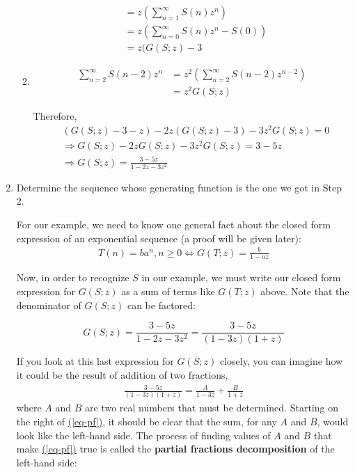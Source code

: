 \documentclass[10pt,]{book}
\newcommand{\terminology}[1]{\textbf{#1}}
\theoremstyle{plain}
\theoremstyle{definition}
\theoremstyle{definition}
\theoremstyle{definition}
\theoremstyle{definition}
\numberwithin{equation}{section}
\begin{document}
\begin{enumerate}[label=\arabic*]
\begin{enumerate}[label=\alph*]
\begin{equation*}
\begin{split}
		& =z\left(\sum_{n=1}^{\infty} S(n) z^n\right)\\
		& = z\left(\sum_{n=0}^{\infty} S(n) z^n-S(0)\right)\\
		&= z(G(S;z)-3
\end{split}
\end{equation*}
%
\item\hypertarget{li-124}{}
\begin{equation*}
\begin{split}
\sum_{n=2}^{\infty} S(n-2) z^n  & = z^2\left(\sum_{n=2}^{\infty} S(n-2) z^{n-2}\right)\\
	& =z^2G(S;z)
\end{split}
\end{equation*}
%
\par
Therefore, 
\begin{equation*}
\begin{split}
&(G(S;z)-3-z)-2z(G(S;z)-3)-3z^2G(S;z)=0\\
	 & \Rightarrow G(S;z)-2z G(S;z)-3z^2G(S;z)=3 - 5z\\
		&\Rightarrow G(S;z)=\frac{3-5z}{1-2z-3z^2}
\end{split}
\end{equation*}
%
\end{enumerate}
%
\item\hypertarget{li-125}{}Determine the sequence whose generating function is the one we got in Step 2.%
\par
For our example, we need to know one general fact about the closed form expression of an exponential sequence (a proof will be given later):
\begin{gather}
T(n)=b a^n ,n\geq 0 \Leftrightarrow G(T;z)=\frac{b}{1-a z} \label{gf-of-exp}
\end{gather}
%
\par
Now, in order to recognize \(S\) in our example, we must write our closed form expression for \(G(S;z)\) as a sum of terms like \(G(T;z)\) above. Note that the denominator of \(G(S;z)\) can be factored:

 \[G(S;z)=\frac{3-5z}{1-2z-3z^2} =\frac{3-5z}{(1-3z)(1+z)}\]

If you look at this last expression for \(G(S;z)\) closely, you can imagine how it could be the result of addition of two fractions,
\begin{gather}
\frac{3-5z}{(1-3z)(1+z)} = \frac{A}{1-3z}+ \frac{B}{1+z}
\label{eq-pf}
\end{gather}
where \(A\) and \(B\) are two real numbers that must be determined. Starting on the right of \hyperref[eq-pf]{(\ref{eq-pf})}, it should be clear that the sum, for
any \(A\) and \(B\), would look like the left-hand side. The process of finding values of \(A\) and \(B\) that make \hyperref[eq-pf]{(\ref{eq-pf})}
true is called the \terminology{partial fractions decomposition} of the left-hand side:


\end{enumerate}
\end{document}
